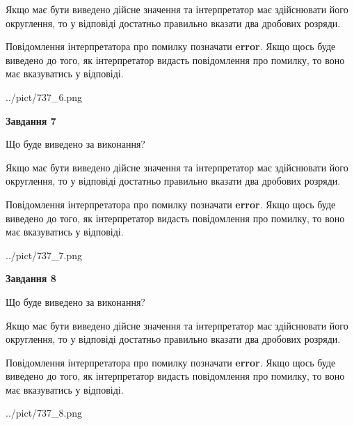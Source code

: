 \documentclass[12pt, ukrainian]{article}
\begin{document}
{\begin {Large}
Якщо має бути виведено дійсне значення та інтерпретатор має здійснювати його округлення, 
то у відповіді достатньо правильно вказати два дробових розряди.

Повідомлення інтерпретатора про помилку позначати \textbf{error}.
Якщо щось буде виведено до того, як інтерпретатор видасть повідомлення про помилку, 
то воно має вказуватись у відповіді. \par

\begin{center}
	{../pict/737_6.png}
\end{center}
\newpage

{\begin {center}\textbf{Завдання 7}\end {center}}\par
Що буде виведено за виконання? \par

Якщо має бути виведено дійсне значення та інтерпретатор має здійснювати його округлення, 
то у відповіді достатньо правильно вказати два дробових розряди.

Повідомлення інтерпретатора про помилку позначати \textbf{error}.
Якщо щось буде виведено до того, як інтерпретатор видасть повідомлення про помилку, 
то воно має вказуватись у відповіді. \par

\begin{center}
	{../pict/737_7.png}
\end{center}
\newpage

{\begin {center}\textbf{Завдання 8}\end {center}}\par
Що буде виведено за виконання? \par

Якщо має бути виведено дійсне значення та інтерпретатор має здійснювати його округлення, 
то у відповіді достатньо правильно вказати два дробових розряди.

Повідомлення інтерпретатора про помилку позначати \textbf{error}.
Якщо щось буде виведено до того, як інтерпретатор видасть повідомлення про помилку, 
то воно має вказуватись у відповіді. \par

\begin{center}
	{../pict/737_8.png}
\end{center}
\newpage


\end{Large}}
\end{document}
